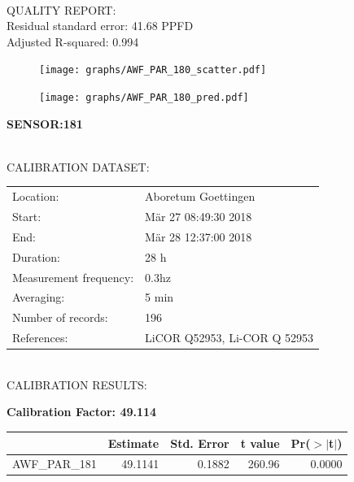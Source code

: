 \documentclass[oneside]{report}
\begin{document}
\hrulefill\\
QUALITY REPORT:\\
Residual standard error: 41.68 PPFD\\
Adjusted R-squared: 0.994



\begin{figure}[H]
  \centering
  \texttt{[image: graphs/AWF\_PAR\_180\_scatter.pdf]}
\end{figure}




\begin{figure}[H]
  \centering
  \texttt{[image: graphs/AWF\_PAR\_180\_pred.pdf]}
\end{figure}

\pagebreak


\begin{center}
\large{\textbf{SENSOR:181}}\\
\end{center}

\hrulefill\\
CALIBRATION DATASET:\\
\begin{table}[h!]
  \centering
  \label{tab:table1}
  \begin{tabular}{ll}
    Location: & Aboretum Goettingen\\ 
    
    
    Start:  & Mär 27 08:49:30 2018 \\
    End:   & Mär 28 12:37:00 2018\\ 
    Duration: & 28 h\\
    Measurement frequency: & 0.3hz\\
    Averaging:  &5 min\\
    Number of records: & 196 \\
    References: & LiCOR Q52953, Li-COR Q 52953 \\
  \end{tabular}
\end{table}

\hrulefill\\
CALIBRATION RESULTS:\\


\begin{center}
\textbf{\large{Calibration Factor: 49.114}}\\
\end{center}
\begin{table}[ht]
\centering
\begin{tabular}{rrrrr}
  \hline
 & Estimate & Std. Error & t value & Pr($>$$|$t$|$) \\ 
  \hline
AWF\_PAR\_181 & 49.1141 & 0.1882 & 260.96 & 0.0000 \\ 
   \hline
\end{tabular}
\end{table}
\end{document}
